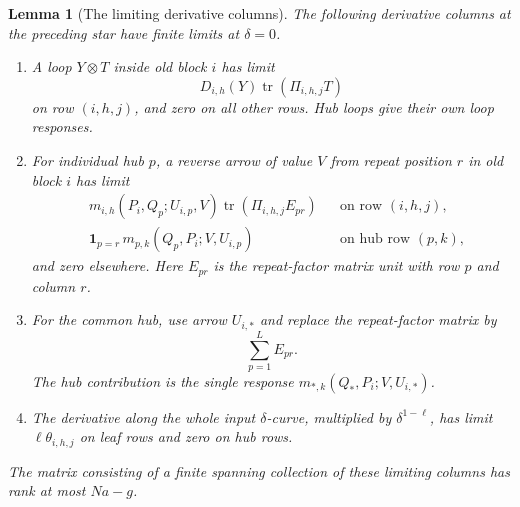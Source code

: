 \documentclass[11pt]{article}
\newtheorem{lemma}[theorem]{Lemma}
\theoremstyle{definition}
\theoremstyle{remark}
\numberwithin{equation}{section}
\begin{document}
 
\begin{lemma}[The limiting derivative columns]
\label{lem:limiting-columns}
The following derivative columns at the preceding star have finite
limits at \(\delta=0\).
\begin{enumerate}
\item A loop \(Y\otimes T\) inside old block \(i\) has limit
\[
 D_{i,h}(Y)\operatorname{tr}(\Pi_{i,h,j}T)
\]
on row \((i,h,j)\), and zero on all other rows. Hub loops give
their own loop responses.
\item For individual hub \(p\), a reverse arrow of value \(V\)
from repeat position \(r\) in old block \(i\) has limit
\begin{align*}
 &m_{i,h}(P_i,Q_p;U_{i,p},V)
      \operatorname{tr}(\Pi_{i,h,j}E_{pr})
       &&\text{on row }(i,h,j),\\
 &\mathbf 1_{p=r}\,
   m_{p,k}(Q_p,P_i;V,U_{i,p})
       &&\text{on hub row }(p,k),
\end{align*}
and zero elsewhere. Here \(E_{pr}\) is the repeat-factor matrix
unit with row \(p\) and column \(r\).
\item For the common hub, use arrow \(U_{i,*}\) and replace the
repeat-factor matrix by
\[
 \sum_{p=1}^L E_{pr}.
\]
The hub contribution is the single response
\(m_{*,k}(Q_*,P_i;V,U_{i,*})\).
\item The derivative along the whole input \(\delta\)-curve,
multiplied by \(\delta^{1-\ell}\), has limit
\(\ell\theta_{i,h,j}\) on leaf rows and zero on hub rows.
\end{enumerate}
The matrix consisting of a finite spanning collection of these
limiting columns has rank at most \(Na-g\).
\end{lemma}
\end{document}

